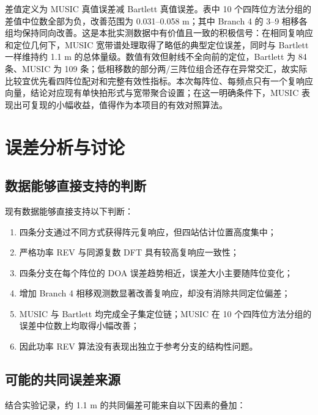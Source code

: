\documentclass[UTF8,12pt,a4paper]{ctexart}
\begin{document}
差值定义为 MUSIC 真值误差减 Bartlett 真值误差。表中 10 个四阵位方法分组的差值中位数全部为负，改善范围为 0.031--0.058 m；其中 Branch 4 的 3--9 相移各组均保持同向改善。这是本批实测数据中有价值且一致的积极信号：在相同复响应和定位几何下，MUSIC 宽带谱处理取得了略低的典型定位误差，同时与 Bartlett 一样维持约 1.1 m 的总体量级。数值有效但射线不全向前的定位，Bartlett 为 84 条、MUSIC 为 109 条；低相移数的部分两/三阵位组合还存在异常交汇，故实际比较宜优先看四阵位配对和完整有效性指标。本次每阵位、每频点只有一个复响应向量，结论对应现有单快拍形式与宽带聚合设置；在这一明确条件下，MUSIC 表现出可复现的小幅收益，值得作为本项目的有效对照算法。

\section{误差分析与讨论}

\subsection{数据能够直接支持的判断}

现有数据能够直接支持以下判断：

\begin{enumerate}
  \item 四条分支通过不同方式获得阵元复响应，但四站估计位置高度集中；
  \item 严格功率 REV 与同源复数 DFT 具有较高复响应一致性；
  \item 四条分支在每个阵位的 DOA 误差趋势相近，误差大小主要随阵位变化；
  \item 增加 Branch 4 相移观测数显著改善复响应，却没有消除共同定位偏差；
  \item MUSIC 与 Bartlett 均完成全子集定位链；MUSIC 在 10 个四阵位方法分组的误差中位数上均取得小幅改善；
  \item 因此功率 REV 算法没有表现出独立于参考分支的结构性问题。
\end{enumerate}

\subsection{可能的共同误差来源}

结合实验记录，约 1.1 m 的共同偏差可能来自以下因素的叠加：
\end{document}

